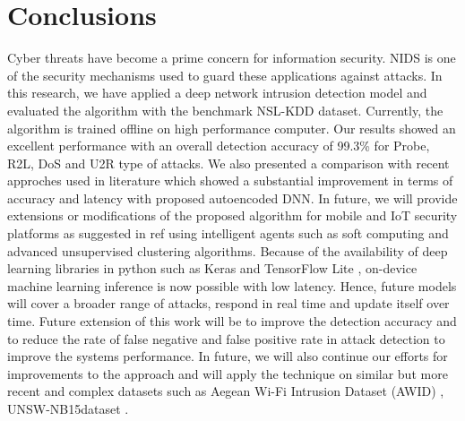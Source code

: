\documentclass[runningheads]{llncs}
\begin{document}
 

\section{Conclusions} \label{sec:conclusions}
 Cyber threats have become a prime concern for information security. NIDS is one of the security mechanisms used to guard these applications against attacks. In this research, we have applied a deep network intrusion detection model and evaluated the algorithm with the benchmark NSL-KDD dataset. Currently, the algorithm is trained offline on high performance computer. Our  results  showed  an  excellent  performance  with  an overall  detection  accuracy  of  99.3\%  for  Probe,  R2L,  DoS and  U2R type  of attacks. We also presented a comparison with recent approches used in literature which showed a substantial improvement in terms of accuracy and latency with proposed autoencoded DNN. In future, we will provide extensions or modifications of the proposed algorithm for mobile and IoT security platforms as suggested in ref \cite{ABAWAJY2018} using intelligent agents  such as soft computing and advanced unsupervised clustering algorithms. Because of the availability of deep learning libraries in python such as Keras and TensorFlow Lite \cite{tensorflowlite}, on-device machine learning inference is now possible with low latency. Hence, future models will cover a broader range of attacks, respond in real time and update itself over time. Future extension of this work will be to improve the detection accuracy and to reduce the rate of false negative and false positive rate in attack detection to improve the systems performance. In future, we will also continue our efforts for improvements to the approach and will apply the technique on similar but more recent and complex datasets such as Aegean  Wi-Fi  Intrusion  Dataset  (AWID) \cite{AWID}, UNSW-NB15dataset \cite{UNSW-dataset2015}.
 \FloatBarrier

\renewcommand*{\bibfont}{\small}
\printbibliography
\end{document}

